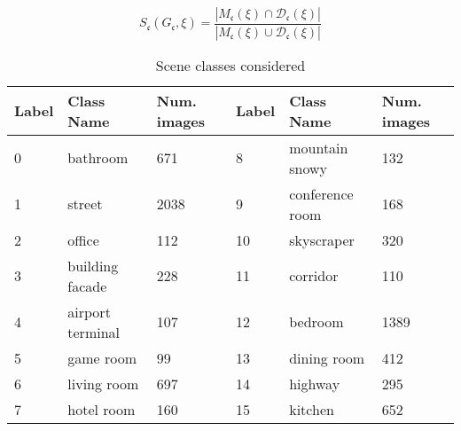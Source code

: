 \documentclass{article}
\begin{document}
$$S_\mathfrak{c}(G_\mathfrak{c},\xi) = \frac{| M_\mathfrak{c}(\xi) \cap \mathcal{D}_{\mathfrak{c}}(\xi) |}{| M_\mathfrak{c}(\xi) \cup \mathcal{D}_{\mathfrak{c}}(\xi) |}$$

\begin{table}[t]
  \caption{Scene classes considered}
  \label{table:sceneclass}
  \centering
  \begin{tabular}{llllll}
    \toprule
    \textbf{Label}  & \textbf{Class Name}  & \textbf{Num. images} & \textbf{Label} & \textbf{Class Name} & \textbf{Num. images} \\
    \midrule
    0 & bathroom      & 671     &  8  & mountain snowy  & 132\\
    1 & street          & 2038  & 9   & conference room   & 168\\
    2 & office            & 112     & 10 & skyscraper       & 320\\
    3 & building facade   & 228     & 11 & corridor       & 110\\ 
    4 & airport terminal & 107    & 12 & bedroom        & 1389\\
    5 & game room     & 99    & 13 & dining room      & 412\\
    6 & living room     & 697     & 14 & highway        & 295 \\
    7 & hotel room    & 160     & 15 & kitchen          & 652\\
    \bottomrule
  \end{tabular}
\end{table}

\end{document}
